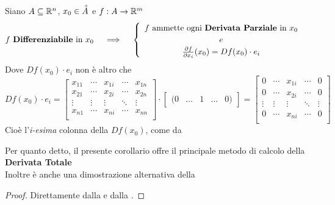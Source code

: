 \begin{corollary}
	\label{coro:se_diff_deriv_parz}
	Siano $A \subseteq \mathbb{R}^n$, $x_0 \in \accentset{\circ}{A}$ e $f:A \to \mathbb{R}^m$
	\[
		f \text{ \textbf{Differenziabile} in } x_0
		\quad \implies \quad
		\begin{cases}
			\begin{array}{c}
				f \text{ ammette ogni \textbf{Derivata Parziale} in } x_0\\
				e\\
				\frac{\partial f}{\partial x_i}(x_0) = Df(x_0) \cdot e_i
			\end{array}
		\end{cases}
	\]
	Dove $Df(x_0) \cdot e_i$ non è altro che
	\[
		Df(x_0) \cdot e_i =
		\begin{bmatrix}
			x_{11} & \cdots & x_{1i} & \cdots & x_{1n}\\
			x_{21} & \cdots & x_{2i} & \cdots & x_{2n}\\
			\vdots & \vdots & \vdots & \ddots & \vdots\\
			x_{n1} & \cdots & x_{ni} & \cdots & x_{nn}\\
		\end{bmatrix}
		\cdot
		\begin{bmatrix}
			(0 & \dots & 1 & \dots & 0)
		\end{bmatrix}
		=
		\begin{bmatrix}
			0 & \cdots & x_{1i} & \cdots & 0\\
			0 & \cdots & x_{2i} & \cdots & 0\\
			\vdots & \vdots & \vdots & \ddots & \vdots\\
			0 & \cdots & x_{ni} & \cdots & 0\\
		\end{bmatrix}
	\]
	Cioè l'\textit{i-esima} colonna della $Df(x_0)$, come da 
	\begin{note}
		Per quanto detto, il presente corollario offre il principale metodo di calcolo della \textbf{Derivata Totale}\\
		Inoltre è anche una dimostrazione alternativa della 
	\end{note}
	\begin{proof}
		Direttamente dalla  e dalla .
	\end{proof}
\end{corollary}
